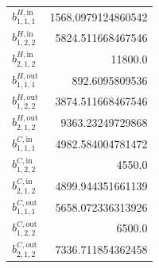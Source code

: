 \documentclass{article}%
\begin{document}
\begin{multicols*}{3}
\begin{supertabular}{lr}
	$b_{1,1,1}^{H,\text{in}}$ & 1568.0979124860542 \\%
	$b_{1,2,2}^{H,\text{in}}$ & 5824.511668467546 \\%
	$b_{2,1,2}^{H,\text{in}}$ & 11800.0 \\%
	$b_{1,1,1}^{H,\text{out}}$ & 892.6095809536 \\%
	$b_{1,2,2}^{H,\text{out}}$ & 3874.511668467546 \\%
	$b_{2,1,2}^{H,\text{out}}$ & 9363.23249729868 \\%
	$b_{1,1,1}^{C,\text{in}}$ & 4982.584004781472 \\%
	$b_{1,2,2}^{C,\text{in}}$ & 4550.0 \\%
	$b_{2,1,2}^{C,\text{in}}$ & 4899.944351661139 \\%
	$b_{1,1,1}^{C,\text{out}}$ & 5658.072336313926 \\%
	$b_{1,2,2}^{C,\text{out}}$ & 6500.0 \\%
	$b_{2,1,2}^{C,\text{out}}$ & 7336.711854362458 \\%
\end{supertabular}%
\end{multicols*}%
\clearpage%
\end{document}
